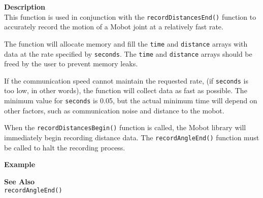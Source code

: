 \noindent
{\bf Description}\\
This function is used in conjunction with the \texttt{recordDistancesEnd()}
function to accurately record the motion of a Mobot joint at a relatively fast
rate. 

The function will allocate memory and fill the \texttt{time} and \texttt{distance} arrays with data
at the rate specified by \texttt{seconds}. The \texttt{time} and \texttt{distance} arrays should
be freed by the user to prevent memory leaks.

If the communication speed cannot maintain 
the requested rate, (if \texttt{seconds} is too low, in other words), the function will
collect data as fast as possible. The minimum value for \texttt{seconds} is 0.05, but
the actual minimum time will depend on other factors, such as communication noise and
distance to the mobot.

When the \texttt{recordDistancesBegin()} function is called, the Mobot library will 
immediately begin recording distance data. The \texttt{recordAngleEnd()} function
must be called to halt the recording process. 

\noindent
{\bf Example}\\
\noindent

\noindent
{\bf See Also}\\
\texttt{recordAngleEnd()} \\
